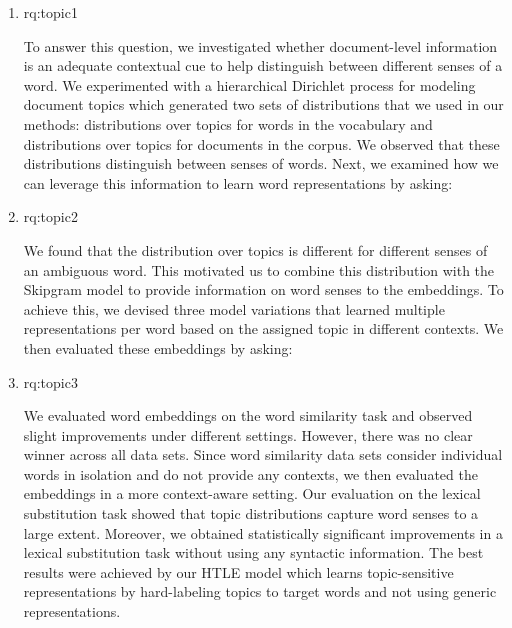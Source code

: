 \begin{enumerate}[label=\textbf{RQ1.\arabic* },wide = 0pt, leftmargin=2em]
\setlength\itemsep{1em}
\item \acl{rq:topic1}  \label{rq:topic1}

\noindent To answer this question, we investigated whether document-level information is an adequate contextual cue to help distinguish between different senses of a word.
We experimented with a hierarchical Dirichlet process for modeling document topics which generated two sets of distributions that we used in our methods: distributions over topics for words in the vocabulary and distributions over topics for documents in the corpus. 
We observed that these distributions distinguish between senses of words. 
Next, we examined how we can leverage this information to learn word representations by asking:

\item \acl{rq:topic2}  \label{rq:topic2}

\medskip

\noindent We found that the distribution over topics is different for different senses of an ambiguous word. 
This motivated us to combine this distribution with the Skipgram model to provide information on word senses to the embeddings. 
To achieve this, we devised three model variations that learned multiple representations per word based on the assigned topic in different contexts. 
We then evaluated these embeddings by asking: 

\item \acl{rq:topic3}  \label{rq:topic3}

\medskip

\noindent We evaluated word embeddings on the word similarity task and observed slight improvements under different settings. 
However, there was no clear winner across all data sets. 
Since word similarity data sets consider individual words in isolation and do not provide any contexts, we then evaluated the embeddings in a more context-aware setting.
Our evaluation on the lexical substitution task showed that topic distributions capture word senses to a large extent. 
Moreover, we obtained statistically significant improvements in a lexical substitution task without using any syntactic information.  
The best results were achieved by our HTLE model which learns topic-sensitive representations by hard-labeling topics to target words and not using generic representations. 

\end{enumerate}

